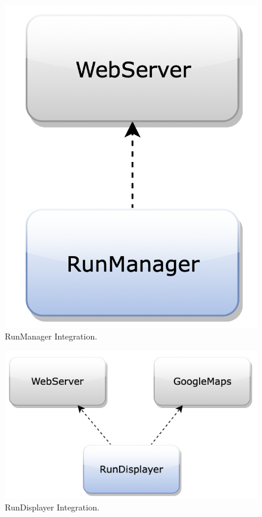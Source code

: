 \begin{figure}[H]
\begin{center}
\begin{minipage}[c]{.40\textwidth}
\includegraphics[scale=0.35,valign=t]{Images/IntegrationPlanImages/fig13.png}
\vspace{0.3cm}
\caption{RunManager Integration.}
        \end{minipage}
      \end{center}
      \vspace{0.8cm}
\end{figure}

\begin{figure}[H]
\centering
\includegraphics[scale=0.35]{Images/IntegrationPlanImages/fig14.png}
\caption{RunDisplayer Integration.}
\end{figure}

